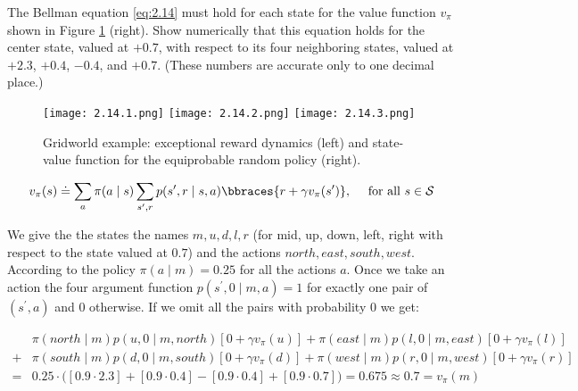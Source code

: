 \begin{exercise}
The Bellman equation \eqref{eq:2.14} must hold for each state for the value function $v_\pi$ shown in Figure \ref{fig:2.14} (right). %
Show numerically that this equation holds for the center state, valued at $+0.7$, with respect to its four neighboring states, valued at $+2.3$, $+0.4$, $-0.4$, and $+0.7$.
(These numbers are accurate only to one decimal place.)

\begin{figure}[H]
    \centering
    \subfloat
    {
        \texttt{[image: 2.14.1.png]}
    }
    \hspace{1cm}
    \subfloat
    {
        \texttt{[image: 2.14.2.png]}
    }
    \hspace{1cm}
    \subfloat
    {
        \texttt{[image: 2.14.3.png]}
    }
    \hspace{0mm}
    \caption
    {
        Gridworld example:
        exceptional reward dynamics (left) and state-value function for the equiprobable random policy (right).
    }
    \label{fig:2.14}
\end{figure}

\begin{align} \label{eq:2.14}
    v_\pi(s)
    \doteq
    \sum_a
        \pi(a \mid s)
        \sum_{s^\prime, r}
            p(s^\prime, r \mid s, a)
            \bbraces{r + \gamma v_\pi(s^\prime)},
    \quad
    ~\text{for all}~ s \in \mathcal S
\end{align}

\end{exercise}

\begin{solution}
  We give the the states the names $m, u, d, l, r$ (for mid, up, down, left, right with respect to the state valued at $0.7$) and the actions $north, east, south, west$. According to the policy $\pi(a \mid m) = 0.25$ for all the actions $a$. Once we take an action the four argument function $p(s^\prime, 0 \mid m, a) = 1$ for exactly one pair of $(s^\prime, a)$ and $0$ otherwise. If we omit all the pairs with probability $0$ we get:

  \begin{align*}
    &\pi(north\mid m) p(u,0\mid m, north)[0 + \gamma v_\pi(u)]
    +
    \pi(east\mid m) p(l, 0 \mid m, east)[0 + \gamma v_\pi(l)] \\
    +
    &\pi(south\mid m) p(d,0\mid m, south)[0 + \gamma v_\pi(d)]
    +
    \pi(west\mid m) p(r, 0 \mid m, west)[0 + \gamma v_\pi(r)] \\
    =&
    0.25 \cdot\big([0.9\cdot 2.3] + [0.9\cdot 0.4] - [0.9\cdot 0.4] + [0.9\cdot 0.7]\big)
    =
    0.675
    \approx
    0.7
    =
    v_\pi(m)
  \end{align*}
\end{solution}
